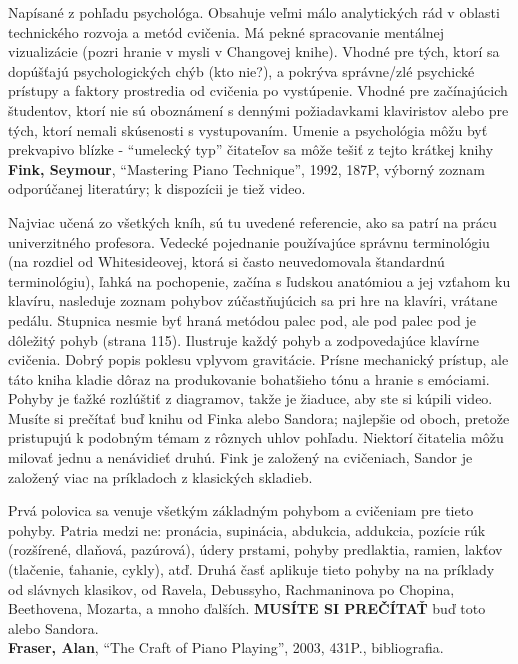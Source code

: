 \documentclass[11pt,a4paper]{book}
\begin{document}
Napísané z pohľadu psychológa. Obsahuje veľmi málo analytických rád v oblasti technického rozvoja a metód cvičenia. Má pekné spracovanie mentálnej vizualizácie (pozri hranie v mysli v Changovej knihe). Vhodné pre tých, ktorí sa dopúšťajú psychologických chýb (kto nie?), a pokrýva správne/zlé psychické prístupy a faktory prostredia od cvičenia po vystúpenie. Vhodné pre začínajúcich študentov, ktorí nie sú oboznámení s dennými požiadavkami klaviristov alebo pre tých, ktorí nemali skúsenosti s vystupovaním. Umenie a psychológia môžu byť prekvapivo blízke - “umelecký typ” čitateľov sa môže tešiť z tejto krátkej knihy 
\medskip\\
\textbf{Fink, Seymour}, “Mastering Piano Technique”, 1992, 187P, výborný zoznam odporúčanej literatúry; k dispozícii je tiež video. 

Najviac učená zo všetkých kníh, sú tu uvedené referencie, ako sa patrí na prácu univerzitného profesora. Vedecké pojednanie používajúce správnu terminológiu (na rozdiel od Whitesideovej, ktorá si často neuvedomovala štandardnú terminológiu), ľahká na pochopenie, začína s ľudskou anatómiou a jej vzťahom ku klavíru, nasleduje zoznam pohybov zúčastňujúcich sa pri hre na klavíri, vrátane pedálu. Stupnica nesmie byť hraná metódou palec pod, ale pod palec pod je dôležitý pohyb (strana 115). Ilustruje každý pohyb a zodpovedajúce klavírne cvičenia. Dobrý popis poklesu vplyvom gravitácie. Prísne mechanický prístup, ale táto kniha kladie dôraz na produkovanie bohatšieho tónu a hranie s emóciami. Pohyby je ťažké rozlúštiť z diagramov, takže je žiaduce, aby ste si kúpili video. Musíte si prečítať buď knihu od Finka alebo Sandora; najlepšie od oboch, pretože pristupujú k podobným témam z rôznych uhlov pohľadu. Niektorí čitatelia môžu milovať jednu a nenávidieť druhú. Fink je založený na cvičeniach, Sandor je založený viac na príkladoch z klasických skladieb. 

Prvá polovica sa venuje všetkým základným pohybom a cvičeniam pre tieto pohyby. Patria medzi ne: pronácia, supinácia, abdukcia, addukcia, pozície rúk (rozšírené, dlaňová, pazúrová), údery prstami, pohyby predlaktia, ramien, lakťov (tlačenie, ťahanie, cykly), atď. Druhá časť aplikuje tieto pohyby na na príklady od slávnych klasikov, od Ravela, Debussyho, Rachmaninova po Chopina, Beethovena, Mozarta, a mnoho ďalších. \textbf{MUSÍTE SI PREČÍTAŤ} buď toto alebo Sandora. 
\medskip\\
\textbf{\hypertarget{r:fraser}{Fraser, Alan}}, “The Craft of Piano Playing”, 2003, 431P., bibliografia. 
\end{document}
